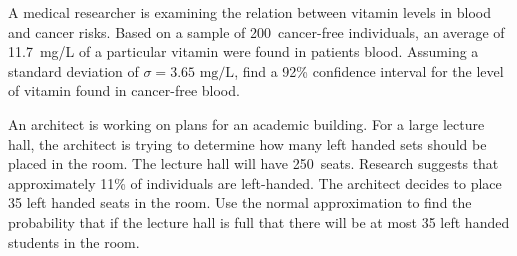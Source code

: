 \documentclass[12pt,letterpaper]{exam}
\begin{document}
\begin{questions}
\newpage
\question[10] A medical researcher is examining the relation between vitamin levels in blood and cancer risks. Based on a sample of 200~cancer-free individuals, an average of 11.7~mg/L of a particular vitamin were found in patients blood. Assuming a standard deviation of $\sigma= 3.65 \text{ mg/L}$, find a 92\% confidence interval for the level of vitamin found in cancer-free blood.  



\newpage
\question[10] An architect is working on plans for an academic building. For a large lecture hall, the architect is trying to determine how many left handed sets should be placed in the room. The lecture hall will have 250~seats. Research suggests that approximately 11\% of individuals are left-handed. The architect decides to place 35 left handed seats in the room. Use the normal approximation to find the probability that if the lecture hall is full that there will be at most 35 left handed students in the room. 


\end{questions}
\end{document}
